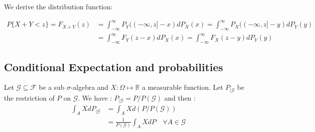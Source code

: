 We derive the distribution function:

\begin{align*}
P\{X+Y < z\} = F_{X+Y}(z) &= \int_{-\infty}^{\infty} P_Y((-\infty, z] - x) dP_X(x) = \int_{-\infty}^{\infty} P_X((-\infty, z] - y) dP_Y(y) \\
&= \int_{-\infty}^{\infty} F_Y(z - x) dP_X(x) = \int_{-\infty}^{\infty} F_X(z - y) dP_Y(y)
\end{align*}

\newpage
\subsection{Conditional Expectation and probabilities}
Let $\mathcal{G} \subseteq \mathcal{F}$ be a sub $\sigma$-algebra and $X:\Omega \longmapsto \mathbb{R}$ a measurable function. Let $P_{|\mathcal{G}}$ be the restriction of $P$ on $\mathcal{G}$. We have : $P_{|\mathcal{G}} = P/P(\mathcal{G})$ and then :
\begin{align*}
    \int_A XdP_{|\mathcal{G}}	&= \int_A Xd(P/P(\mathcal{G})) \\
				&= \frac{1}{P(\mathcal{G})} \int_A XdP \quad \forall A \in \mathcal{G}
\end{align*}


